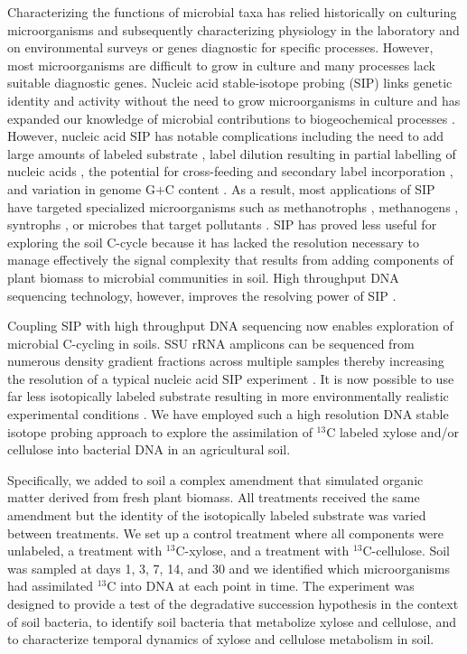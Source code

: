 Characterizing the functions of microbial taxa has relied historically on
culturing microorganisms and subsequently characterizing physiology in the
laboratory and on environmental surveys or genes diagnostic for specific
processes. However, most microorganisms are difficult to grow in
culture \citep{Janssen2006} and many processes lack suitable diagnostic genes.
Nucleic acid stable-isotope probing (SIP) links genetic identity and activity
without the need to grow microorganisms in culture and has expanded our
knowledge of microbial contributions to biogeochemical processes
\citep{Chen_Murrell_2010}. However, nucleic acid SIP has notable complications
including the need to add large amounts of labeled substrate
\citep{radajewski2000stable}, label dilution resulting in partial labelling of
nucleic acids \citep{radajewski2000stable,Manefield_2002,McDonald_2005}, the
potential for cross-feeding and secondary label incorporation
\citep{Morris_2002,Hutchens2004,14686943,DeRito2005,McDonald_2005,Ziegler_2005},
and variation in genome G$+$C content
\citep{Buckley_2007,9780408708036,Holben1995,Nusslein1999}. As a result, most
applications of SIP have targeted specialized microorganisms such as
methanotrophs \citep{radajewski2000stable}, methanogens \citep{lu2005},
syntrophs \citep{lueders2004}, or microbes that target pollutants
\citep{derito2005}. SIP has proved less useful for exploring the soil C-cycle
because it has lacked the resolution necessary to manage effectively the signal
complexity that results from adding components of plant biomass to microbial
communities in soil. High throughput DNA sequencing technology, however,
improves the resolving power of SIP \citep{Aoyagi2015}. 

Coupling SIP with high throughput DNA sequencing now enables exploration of
microbial C-cycling in soils. SSU rRNA amplicons can be sequenced
from numerous density gradient fractions across multiple samples thereby
increasing the resolution of a typical nucleic acid SIP experiment
\citep{Verastegui_2014}. It is now possible to use far less isotopically
labeled substrate resulting in more environmentally realistic experimental
conditions \citep{Aoyagi2015}. We have employed such a high resolution DNA
stable isotope probing approach to explore the assimilation of $^{13}$C labeled
xylose and/or cellulose into bacterial DNA in an agricultural soil. 

Specifically, we added to soil a complex amendment that simulated organic
matter derived from fresh plant biomass. All treatments received the same
amendment but the identity of the isotopically labeled substrate was varied
between treatments. We set up a control treatment where all components were
unlabeled, a treatment with $^{13}$C-xylose, and a treatment with
$^{13}$C-cellulose. Soil was sampled at days 1, 3, 7, 14, and 30 and we
identified which microorganisms had assimilated $^{13}$C into DNA at each point
in time. The experiment was designed to provide a test of the
degradative succession hypothesis in the context of soil bacteria, to identify
soil bacteria that metabolize xylose and cellulose, and to characterize
temporal dynamics of xylose and cellulose metabolism in soil. 
